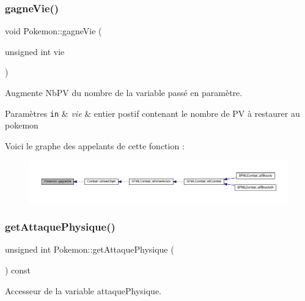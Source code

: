 \subsubsection{\texorpdfstring{gagne\+Vie()}{gagneVie()}}
{\footnotesize\ttfamily void Pokemon\+::gagne\+Vie (\begin{DoxyParamCaption}\item[{unsigned int}]{vie }\end{DoxyParamCaption})}



Augmente Nb\+PV du nombre de la variable passé en paramètre. 


\begin{DoxyParams}[1]{Paramètres}
\mbox{\tt in}  & {\em vie} & entier postif contenant le nombre de PV à restaurer au pokemon \\
\hline
\end{DoxyParams}
Voici le graphe des appelants de cette fonction \+:\nopagebreak
\begin{figure}[H]
\begin{center}
\leavevmode
\includegraphics[width=350pt]{class_pokemon_ac5ce7b3dd6a431cbc5d73c27e4aeac36_icgraph}
\end{center}
\end{figure}
\mbox{\label{class_pokemon_a27ae3d139d0c958b2f605743eb8f8a6d}} 
\subsubsection{\texorpdfstring{get\+Attaque\+Physique()}{getAttaquePhysique()}}
{\footnotesize\ttfamily unsigned int Pokemon\+::get\+Attaque\+Physique (\begin{DoxyParamCaption}{ }\end{DoxyParamCaption}) const}



Accesseur de la variable attaque\+Physique. 

